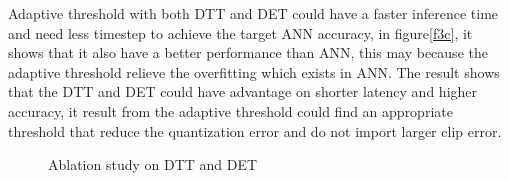 \documentclass{article}
\begin{document}
Adaptive threshold with both DTT and DET could have a faster inference time and need less timestep to achieve the target ANN accuracy, in figure\ref{f3c}, it shows that it also have a better performance than ANN,
this may because the adaptive threshold relieve the overfitting which exists in ANN. The result shows that the DTT and DET could have advantage on shorter latency and higher accuracy, it result from the adaptive threshold could find an appropriate
threshold that reduce the quantization error and do not import larger clip error.
\begin{figure}[htbp]
  \centering
  \quad

    \quad
  \caption{Ablation study on DTT and DET}
  \label{AS}
\end{figure}
\end{document}
